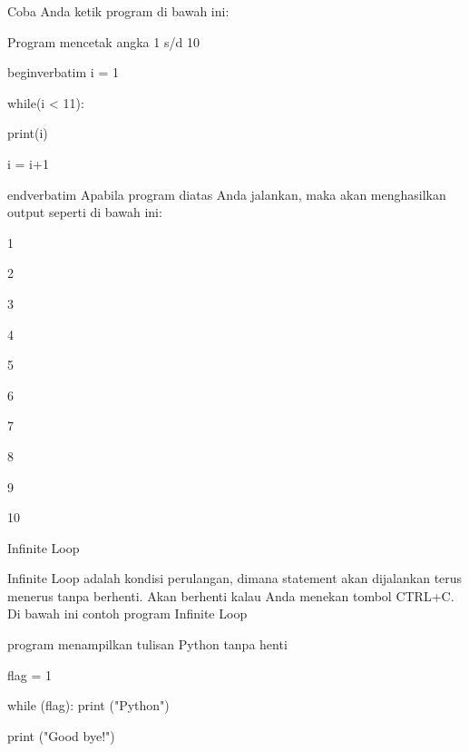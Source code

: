 \vspace{\baselineskip}
Coba Anda ketik program di bawah ini:\vspace{\baselineskip}
\vspace{\baselineskip}
 \par
Program mencetak angka 1 s/d 10 \par
\vspace{12pt}
begin{verbatim}
i = 1 \par
while(i < 11): \par
 print(i) \par
 i = i+1 \par
 end{verbatim}
\vspace{\baselineskip}
Apabila program diatas Anda jalankan, maka akan menghasilkan output seperti di bawah ini:\vspace{\baselineskip}
\vspace{\baselineskip}
 \par
1 \par
2 \par
3 \par
4 \par
5 \par
6 \par
7 \par
8 \par
9 \par
10 \par
\vspace{12pt}
\vspace{\baselineskip}
\vspace{12pt}
Infinite Loop \par
\vspace{\baselineskip}
Infinite Loop adalah kondisi perulangan, dimana statement akan dijalankan terus menerus tanpa berhenti. Akan berhenti kalau Anda menekan tombol CTRL+C.\vspace{\baselineskip}
\vspace{\baselineskip}
Di bawah ini contoh program Infinite Loop\vspace{\baselineskip}
\vspace{\baselineskip}
 \par
program menampilkan tulisan Python tanpa henti \par
\vspace{12pt}
flag = 1 \par
\vspace{12pt}
while (flag): print ("Python") \par
print ("Good bye!") \par
